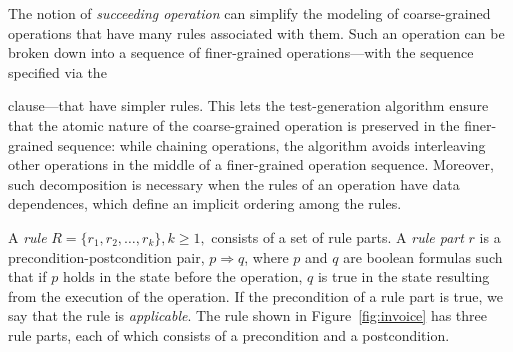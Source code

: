 The notion of \textit{succeeding operation} can simplify the modeling of
coarse-grained operations that have many rules associated with them. Such an
operation can be broken down into a sequence of finer-grained operations---with
the sequence specified via the \subject{next} clause---that have simpler
rules. This lets the test-generation algorithm ensure that the atomic nature of
the coarse-grained operation is preserved in the finer-grained sequence: while
chaining operations, the algorithm avoids interleaving other operations in the
middle of a finer-grained operation sequence.  Moreover, such decomposition is
necessary when the rules of an operation have data dependences, which define an
implicit ordering among the rules. %

A \textit{rule} $R = \{r_1, r_2, \ldots, r_k\}, k \geq 1,$ consists of a set of
rule parts. A \textit{rule part} $r$ is a precondition-postcondition pair, $p
\Longrightarrow q$, where $p$ and $q$ are boolean formulas such that if $p$
holds in the state before the operation, $q$ is true in the state resulting from
the execution of the operation. If the precondition of a rule part is true, we
say that the rule is \textit{applicable}.  The rule shown in
Figure~\ref{fig:invoice} has three rule parts, each of which consists of a
precondition and a postcondition.





